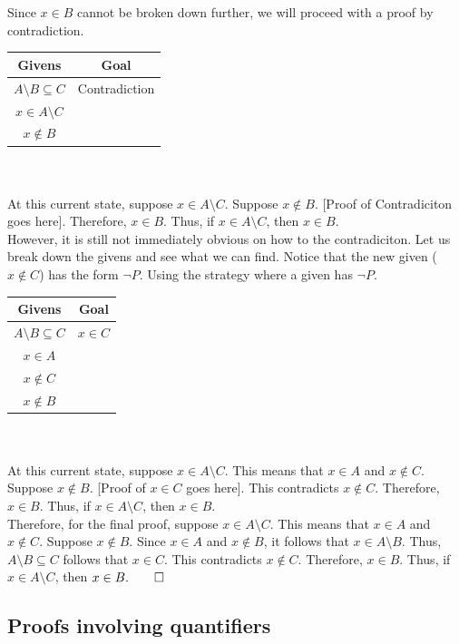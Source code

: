 \documentclass[../setup.tex]{subfiles}
\begin{document}
\phantom \\ \\
Since $x \in B$ cannot be broken down further, we will proceed with a proof by contradiction. \\
\begin{center}
	\begin{tabular}[t]{| c | c |}
		\hline
		Givens  & Goal  \\
		\hline
		$A \setminus B \subseteq C$ & Contradiction \\
		$x \in A \setminus C$ & \\
		$x \notin B$ & \\
		\hline
	\end{tabular}
\end{center}
\phantom \\ \\
At this current state, suppose $x \in A \setminus C$. Suppose $x \notin B$. [Proof of Contradiciton goes here]. Therefore, $x \in B$. Thus, if $x \in A \setminus C$, then $x \in B$. \\
However, it is still not immediately obvious on how to the contradiciton. Let us break down the givens and see what we can find. Notice that the new given ($x \notin C$) has the form $\lnot{P}$. Using the strategy where a given has $\lnot{P}$. \\
\begin{center}
	\begin{tabular}[t]{| c | c |}
		\hline
		Givens  & Goal  \\
		\hline
		$A \setminus B \subseteq C$ & $x \in C$ \\
		$x \in A$ & \\
		$x \notin C$ & \\
		$x \notin B$ & \\
		\hline
	\end{tabular}
\end{center}
\phantom \\ \\
At this current state, suppose $x \in A \setminus C$. This means that $x \in A$ and $x \notin C$. Suppose $x \notin B$. [Proof of $x \in C$ goes here]. This contradicts $x \notin C$. Therefore, $x \in B$. Thus, if $x \in A \setminus C$, then $x \in B$. \\
Therefore, for the final proof,  suppose $x \in A \setminus C$. This means that $x \in A$ and $x \notin C$. Suppose $x \notin B$. Since $x \in A$ and $x \notin B$, it follows that $x \in A \setminus B$. Thus, $A \setminus B \subseteq C$ follows that $x \in C$. This contradicts $x \notin C$. Therefore, $x \in B$. Thus, if $x \in A \setminus C$, then $x \in B. \qed$

\subsection{Proofs involving quantifiers}
\end{document}
